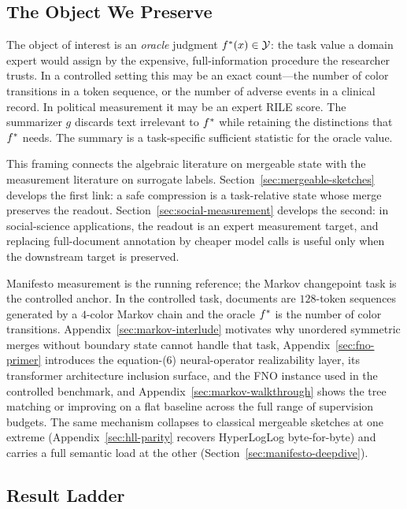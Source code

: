 \subsection{The Object We Preserve}

The object of interest is an \emph{oracle} judgment $f^\ast(x) \in \mathcal{Y}$: the task value a domain expert would assign by the expensive, full-information procedure the researcher trusts. In a controlled setting this may be an exact count---the number of color transitions in a token sequence, or the number of adverse events in a clinical record. In political measurement it may be an expert RILE score. The summarizer $g$ discards text irrelevant to $f^\ast$ while retaining the distinctions that $f^\ast$ needs. The summary is a task-specific sufficient statistic for the oracle value.

This framing connects the algebraic literature on mergeable state with the
measurement literature on surrogate labels. Section~\ref{sec:mergeable-sketches}
develops the first link: a safe compression is a task-relative state whose
merge preserves the readout. Section~\ref{sec:social-measurement} develops
the second: in social-science applications, the readout is an expert
measurement target, and replacing full-document annotation by cheaper model
calls is useful only when the downstream target is preserved.

Manifesto measurement is the running reference; the Markov changepoint task is the controlled anchor. In the controlled task, documents are $128$-token sequences generated by a $4$-color Markov chain and the oracle $f^\ast$ is the number of color transitions. Appendix~\ref{sec:markov-interlude} motivates why unordered symmetric merges without boundary state cannot handle that task, Appendix~\ref{sec:fno-primer} introduces the equation-(6) neural-operator realizability layer, its transformer architecture inclusion surface, and the FNO instance used in the controlled benchmark, and Appendix~\ref{sec:markov-walkthrough} shows the tree matching or improving on a flat baseline across the full range of supervision budgets. The same mechanism collapses to classical mergeable sketches at one extreme (Appendix~\ref{sec:hll-parity} recovers HyperLogLog byte-for-byte) and carries a full semantic load at the other (Section~\ref{sec:manifesto-deepdive}).

\subsection{Result Ladder}


